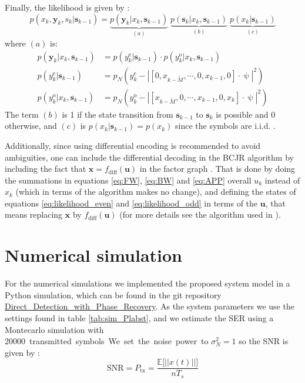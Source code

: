 Finally, the likelihood is given by \cite{Plabst_DD}:
\begin{equation}
p(x_k,\bm y_k,s_k|\bm s_{k-1})=\underbrace{p(\bm y_k|x_k,\bm s_{k-1})}_{(a)}\;
\underbrace{p(\bm s_k|x_k,\bm s_{k-1})}_{(b)}\;
\underbrace{p(x_k|\bm s_{k-1})}_{(c)}
\end{equation}
where $(a)$ is:
\begin{align}
	p(\bm y_k|x_k,\bm s_{k-1})&=p(y_k^\text{e}|\bm s_{k-1})\cdot p(y_k^\text{o}|x_k,\bm s_{k-1})\\
	p(y_k^\text{e}|\bm s_{k-1})&=p_N\left(y_k^\text{e}-\left| [0,x_{k-\widetilde{M}},\cdots,0,x_{k-1},0]\cdot\uppsi\right|^2\right)
	\label{eq:likelihood_even}\\
	p(y_k^\text{o}|x_k,\bm s_{k-1})&=p_N\left(y_k^\text{o}-\left| [x_{k-\widetilde{M}},0,\cdots,x_{k-1},0,x_{k}]\cdot\uppsi\right|^2\right)
	\label{eq:likelihood_odd}
\end{align}
The term $(b)$ is 1 if the state transition from $\bm s_{k-1}$ to $\bm s_{k}$ is possible and 0 otherwise, and $(c)$ is $p(x_k|\bm s_{k-1})=p(x_k)$ since the symbols are i.i.d. \cite{Plabst_DD}.

Additionally, since using differential encoding is recommended to avoid ambiguities, one can include the differential decoding in the BCJR algorithm by including the fact that $\bm x=f_\text{diff}(\bm u)$ in the factor graph \cite{Plabst_DD}. That is done by doing the summations in equations \ref{eq:FW}, \ref{eq:BW} and \ref{eq:APP} overall $u_k$ instead of $x_k$ (which in terms of the algorithm makes no change), and defining the states of equations \ref{eq:likelihood_even} and \ref{eq:likelihood_odd} in terms of the $\bm u$, that means replacing $\bm x$ by $f_\text{diff}(\bm u)$ (for more details see the algorithm used in \cite{Wang}).  


\section{Numerical simulation}

For the numerical simulations we implemented the proposed system model in a Python simulation, which can be found in the git repository \href{https://github.com/dfigueroa11/Direct_Detection_with_Phase_Recovery.git}{Direct\_Detection\_with\_Phase\_Recovery}. As the system parameters we use the settings found in table \ref{tab:sim_Plabst}, and we estimate the SER using a Montecarlo simulation with \SI{20000} transmitted symbols. We set the noise power to $\sigma_N^2=1$ so the SNR is given by \cite{Plabst_DD}:
\begin{equation}
\text{SNR}=P_\text{tx}=\frac{\mathds{E}\bigl[ ||x(t)||\bigr]}{nT_s}
\end{equation}


